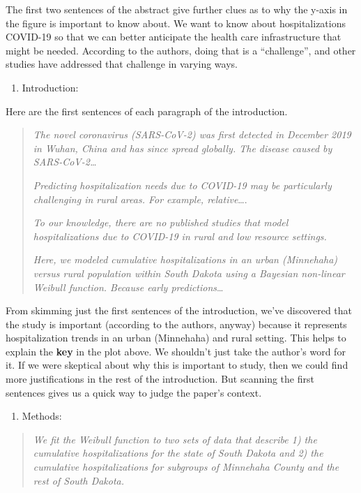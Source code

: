 \documentclass[
]{article}
\providecommand{\tightlist}{%
  \setlength{\itemsep}{0pt}\setlength{\parskip}{0pt}}
\begin{document}
The first two sentences of the abstract give further clues as to why the
y-axis in the figure is important to know about. We want to know about
hospitalizations COVID-19 so that we can better anticipate the health
care infrastructure that might be needed. According to the authors,
doing that is a ``challenge'', and other studies have addressed that
challenge in varying ways.

\begin{enumerate}
\def\labelenumi{\arabic{enumi}.}
\setcounter{enumi}{2}
\tightlist
\item
  Introduction:
\end{enumerate}

Here are the first sentences of each paragraph of the introduction.

\begin{quote}
\emph{The novel coronavirus (SARS-CoV-2) was first detected in December
2019 in Wuhan, China and has since spread globally. The disease caused
by SARS-CoV-2\ldots{}}

\emph{Predicting hospitalization needs due to COVID-19 may be
particularly challenging in rural areas. For example, relative}\ldots.

\emph{To our knowledge, there are no published studies that model
hospitalizations due to COVID-19 in rural and low resource settings.}

\emph{Here, we modeled cumulative hospitalizations in an urban
(Minnehaha) versus rural population within South Dakota using a Bayesian
non-linear Weibull function. Because early predictions}\ldots{}
\end{quote}

From skimming just the first sentences of the introduction, we've
discovered that the study is important (according to the authors,
anyway) because it represents hospitalization trends in an urban
(Minnehaha) and rural setting. This helps to explain the \textbf{key} in
the plot above. We shouldn't just take the author's word for it. If we
were skeptical about why this is important to study, then we could find
more justifications in the rest of the introduction. But scanning the
first sentences gives us a quick way to judge the paper's context.

\begin{enumerate}
\def\labelenumi{\arabic{enumi}.}
\setcounter{enumi}{3}
\tightlist
\item
  Methods:
\end{enumerate}

\begin{quote}
\emph{We fit the Weibull function to two sets of data that describe 1)
the cumulative hospitalizations for the state of South Dakota and 2) the
cumulative hospitalizations for subgroups of Minnehaha County and the
rest of South Dakota.}
\end{quote}
\end{document}
